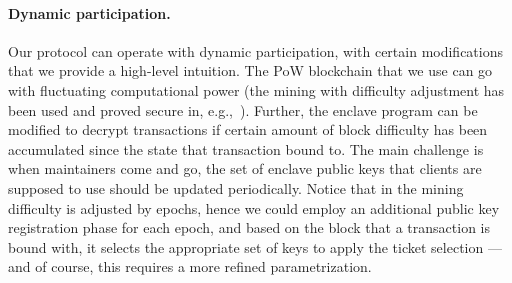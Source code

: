 \paragraph{Dynamic participation.}
%
Our protocol can operate with dynamic participation, with certain modifications that we provide a high-level intuition.
%
The \twoforone PoW blockchain that we use can go with fluctuating computational power (the \twoforone mining with difficulty adjustment has been used and proved secure in, e.g.,~\cite{EC:KiaLeoShe24}).
%
Further, the enclave program can be modified to decrypt transactions if certain amount of block difficulty has been accumulated since the state that transaction bound to.
%
The main challenge is when maintainers come and go, the set of enclave public keys that clients are supposed to use should be updated periodically.
%
Notice that in \cite{EC:KiaLeoShe24} the mining difficulty is adjusted by epochs, hence we could employ an additional public key registration phase for each epoch, and based on the block that a transaction is bound with, it selects the appropriate set of keys to apply the ticket selection --- and of course, this requires a more refined parametrization.
